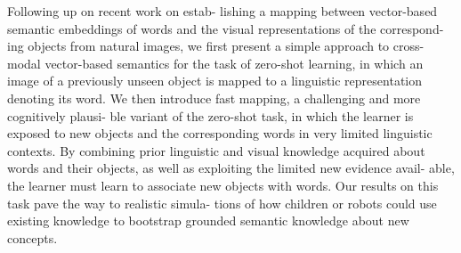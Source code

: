 Following up on recent work on estab- lishing a mapping between vector-based semantic embeddings of words and the visual representations of the correspond- ing objects from natural images, we first present a simple approach to cross-modal vector-based semantics for the task of zero-shot learning, in which an image of a previously unseen object is mapped to a linguistic representation denoting its word. We then introduce fast mapping, a challenging and more cognitively plausi- ble variant of the zero-shot task, in which the learner is exposed to new objects and the corresponding words in very limited linguistic contexts. By combining prior linguistic and visual knowledge acquired about words and their objects, as well as exploiting the limited new evidence avail- able, the learner must learn to associate new objects with words. Our results on this task pave the way to realistic simula- tions of how children or robots could use existing knowledge to bootstrap grounded semantic knowledge about new concepts.
